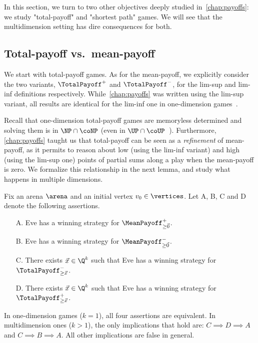 In this section, we turn to two other objectives deeply studied in~\cref{chap:payoffs}: we study "total-payoff" and "shortest path" games. We will see that the multidimension setting has dire consequences for both.

\subsection{Total-payoff vs.~mean-payoff}

We start with total-payoff games. As for the mean-payoff, we explicitly consider the two variants, $\TotalPayoff^+$ and $\TotalPayoff^-$, for the lim-sup and lim-inf definitions respectively. While~\cref{chap:payoffs} was written using the lim-sup variant, all results are identical for the lim-inf one in one-dimension games~\cite{Gawlitza&Seidl:2009}.

Recall that one-dimension total-payoff games are memoryless determined and solving them is in $\NP \cap \coNP$ (even in $\UP \cap \coUP$~\cite{Gawlitza&Seidl:2009}). Furthermore, \cref{chap:payoffs} taught us that total-payoff can be seen as a \textit{refinement} of mean-payoff, as it permits to reason about low (using the lim-inf variant) and high (using the lim-sup one) points of partial sums along a play when the mean-payoff is zero. We formalize this relationship in the next lemma, and study what happens in multiple dimensions. 

\begin{lemma}
\label{12-lem:MPTP}
Fix an arena $\arena$ and an initial vertex $v_0 \in \vertices$. Let A, B, C and D denote the following assertions.
\begin{itemize}
\item[A.] Eve has a winning strategy for $\MeanPayoff^{+}_{\geq \vec{0}}$.
\item[B.] Eve has a winning strategy for $\MeanPayoff^{-}_{\geq \vec{0}}$.
\item[C.] There exists $\vec{x} \in \Q^{k}$ such that Eve has a winning strategy for $\TotalPayoff^{-}_{\geq \vec{x}}$.
\item[D.] There exists $\vec{x} \in \Q^{k}$ such that Eve has a winning strategy for $\TotalPayoff^{+}_{\geq \vec{x}}$.
\end{itemize}
In one-dimension games ($k = 1$), all four assertions are equivalent. In multidimension ones ($k > 1$), the only implications that hold are: $C \implies D \implies A$ and $C \implies B \implies A$. All other implications are false in general.
\end{lemma}

